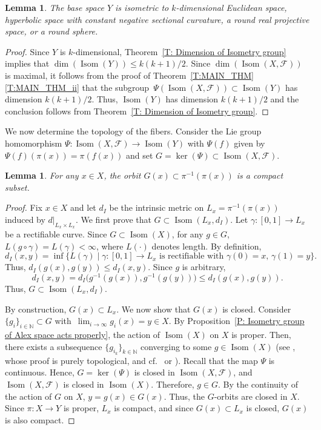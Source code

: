 \documentclass[pdftex]{sigma}
\numberwithin{equation}{section}
\newtheorem{lem}[thm]{Lemma}
\theoremstyle{definition}
\DeclareMathOperator{\Iso}{Isom}
\newcommand{\N}{\mathbb{N}} %
\newcommand{\fol}{\mathcal{F}}
\begin{document}
\begin{lem}\label{L: equality implies base is a manifold isometric to model spaces}
The base space $Y$ is isometric to $k$-dimensional Euclidean space, hyperbolic space with constant negative sectional curvature, a round real projective space, or a round sphere.
\end{lem}

\begin{proof}
Since $Y$ is $k$-dimensional, Theorem~\ref{T: Dimension of Isometry group} implies that $\dim(\Iso(Y))\leq k(k+1)/2$.
Since $\dim(\Iso(X,\fol))$ is maximal, it follows from the proof of Theorem~\ref{T:MAIN_THM}\,\ref{T:MAIN_THM_ii} that the subgroup~${\Psi(\Iso(X,\fol))\subset \Iso(Y)}$ has dimension $k(k+1)/2$. Thus, $\Iso(Y)$ has dimension $k(k+1)/2$ and the conclusion follows from Theorem~\ref{T: Dimension of Isometry group}.
\end{proof}

We now determine the topology of the fibers. Consider the Lie group homomorphism
$
\Psi\colon  \Iso(X,\fol)\to \Iso(Y)
$
with $\Psi(f)$ given by $\Psi(f)(\pi(x)) = \pi(f(x))$ and set $G=\ker(\Psi)\subset \Iso(X,\fol)$.

\begin{lem}\label{L: fibers contain homogeneous subsets}
For any $x\in X$, the orbit $G(x)\subset \pi^{-1}(\pi(x))$ is a compact subset.
\end{lem}

\begin{proof}Fix $x\in X$ and let $d_I$ be the intrinsic metric on $L_{x}=\pi^{-1}(\pi(x))$ induced by $d|_{L_{x}\times L_{x}}$.
We first prove that $G\subset\Iso(L_{x},d_I)$.
Let $\gamma\colon [0,1]\to L_x$ be a rectifiable curve.
Since $G\subset \Iso(X)$, for any $g\in G$,
$L(g\circ \gamma)=L(\gamma)<\infty$,
where $L(\cdot)$ denotes length.
By definition,
\[
d_I(x,y)=\inf\{L(\gamma)\mid \gamma\colon[0,1]\to L_x \text{ is rectifiable with } \gamma(0)=x,\, \gamma(1)=y\}.
\]
Thus, $d_I(g(x),g(y))\leq d_I(x,y)$. Since $g$ is arbitrary,
\[
d_I(x,y)=d_I\bigl(g^{-1}(g(x)),g^{-1}(g(y))\bigr)\leq d_I(g(x),g(y)).
\]
Thus, $G\subset \Iso(L_{x},d_I)$.

By construction, $G(x)\subset L_{x}$.
We now show that $G(x)$ is closed.
Consider $\{g_i\}_{i\in \N}\subset G$ with~${\lim_{i\to\infty}g_i(x)=y\in X}$.
By Proposition~\ref{P: Isometry group of Alex space acts properly}, the action of $\Iso(X)$ on $X$ is proper. Then, there exists a subsequence $\{g_{i_k}\}_{k\in \N}$ converging to some $g\in \Iso(X)$ (see \cite[Proposition~21.5]{Lee}, whose proof is purely topological, and cf.\ \cite[Proposition~2.2]{CorroKordass2019} or \cite{DiazRamos2008a}).
Recall that the map $\Psi$ is continuous. Hence, $G=\ker(\Psi)$ is closed in $\Iso(X,\fol)$, and $\Iso(X,\fol)$ is closed in $\Iso(X)$.
Therefore, $g\in G$.
By the continuity of the action of $G$ on $X$, $y=g(x)\in G(x)$.
Thus, the $G$-orbits are closed in $X$. Since $\pi\colon X\to Y$ is proper, $L_x$ is compact, and since $G(x)\subset L_x$ is closed, $G(x)$ is also compact.
\end{proof}
\end{document}
